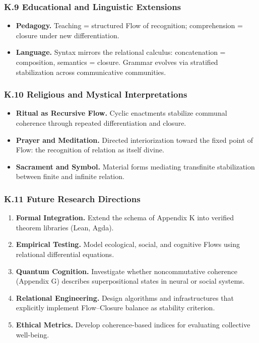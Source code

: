 \documentclass[11pt]{article}
\begin{document}
\subsubsection*{K.9 Educational and Linguistic Extensions}
\label{sec:org3ba44e5}
\begin{itemize}
\item \textbf{\textbf{Pedagogy.}}  Teaching = structured Flow of recognition; comprehension = closure under new differentiation.
\item \textbf{\textbf{Language.}}  Syntax mirrors the relational calculus: concatenation = composition, semantics = closure.  
Grammar evolves via stratified stabilization across communicative communities.
\end{itemize}
\subsubsection*{K.10 Religious and Mystical Interpretations}
\label{sec:orga8042cf}
\begin{itemize}
\item \textbf{\textbf{Ritual as Recursive Flow.}}  Cyclic enactments stabilize communal coherence through repeated differentiation and closure.
\item \textbf{\textbf{Prayer and Meditation.}}  Directed interiorization toward the fixed point of Flow:  
the recognition of relation as itself divine.
\item \textbf{\textbf{Sacrament and Symbol.}}  Material forms mediating transfinite stabilization between finite and infinite relation.
\end{itemize}
\subsubsection*{K.11 Future Research Directions}
\label{sec:orge80a21e}
\begin{enumerate}
\item \textbf{\textbf{Formal Integration.}}  Extend the schema of Appendix K into verified theorem libraries (Lean, Agda).
\item \textbf{\textbf{Empirical Testing.}}  Model ecological, social, and cognitive Flows using relational differential equations.
\item \textbf{\textbf{Quantum Cognition.}}  Investigate whether noncommutative coherence (Appendix G)  
describes superpositional states in neural or social systems.
\item \textbf{\textbf{Relational Engineering.}}  Design algorithms and infrastructures  
that explicitly implement Flow–Closure balance as stability criterion.
\item \textbf{\textbf{Ethical Metrics.}}  Develop coherence-based indices for evaluating collective well-being.
\end{enumerate}
\end{document}
